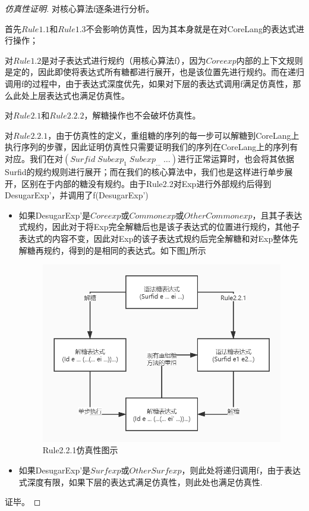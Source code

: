 \begin{proof}[仿真性证明]
	对核心算法f逐条进行分析。
	
	首先$Rule1.1$和$Rule1.3$不会影响仿真性，因为其本身就是在对CoreLang的表达式进行操作；
	
	对$Rule1.2$是对子表达式进行规约（用核心算法f），因为$Coreexp$内部的上下文规则是定的，因此即使将表达式所有糖都进行展开，也是该位置先进行规约。而在递归调用f的过程中，由于表达式深度优先，如果对下层的表达式调用f满足仿真性，那么此处上层表达式也满足仿真性。
	
	对$Rule2.1$和$Rule2.2.2$，解糖操作也不会破坏仿真性。
	
	对$Rule2.2.1$，由于仿真性的定义，重组糖的序列的每一步可以解糖到CoreLang上执行序列的步骤，因此证明仿真性只需要证明我们的序列在CoreLang上的序列有对应。我们在对$(Surfid\;Subexp_{1}\;Subexp_{\ldots}\;\ldots)$进行正常运算时，也会将其依据Surfid的规约规则进行展开；而在我们的核心算法中，我们也是这样进行单步展开，区别在于内部的糖没有规约。由于Rule2.2对Exp进行外部规约后得到DesugarExp'，并调用了f(DesugarExp')
	\begin{itemize}
		\item 如果DesugarExp'是$Coreexp$或$Commonexp$或$OtherCommonexp$，且其子表达式规约，因此对于将Exp完全解糖后也是该子表达式的位置进行规约，其他子表达式的内容不变，因此对Exp的该子表达式规约后完全解糖和对Exp整体先解糖再规约，得到的是相同的表达式。如下图\ref{fig:emulation}所示
		
		\begin{figure}[h]
			\centering
			\includegraphics[width=12cm]{images/chapter3/flowgraph.jpg}
			\caption{Rule2.2.1仿真性图示}
			\label{fig:emulation}
		\end{figure}
		
		\item 如果DesugarExp'是$Surfexp$或$OtherSurfexp$，则此处将递归调用f，由于表达式深度有限，如果下层的表达式满足仿真性，则此处也满足仿真性.
	\end{itemize}

证毕。

\end{proof}






